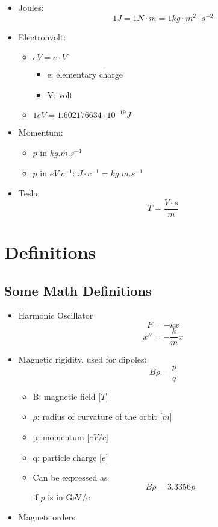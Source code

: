 \documentclass[12pt,a4,]{article}
\numberwithin{equation}{subsection}
\providecommand{\tightlist}{%
  \setlength{\itemsep}{0pt}\setlength{\parskip}{0pt}}
\begin{document}
\begin{itemize}
\item
  Joules: \[1 J = 1 N \cdot m = 1 kg \cdot m^2 \cdot s^{-2}\]
\item
  Electronvolt:

  \begin{itemize}
  \tightlist
  \item
    \(eV = e \cdot V\)

    \begin{itemize}
    \tightlist
    \item
      e: elementary charge
    \item
      V: volt
    \end{itemize}
  \item
    \(1 eV = 1.602176634 \cdot 10^{-19} J\)
  \end{itemize}
\item
  Momentum:

  \begin{itemize}
  \tightlist
  \item
    \(p\) in \(kg.m.s^{-1}\)
  \item
    \(p\) in \(eV.c^{-1}\): \(J \cdot c^{-1} = kg.m.s^{-1}\)
  \end{itemize}
\item
  Tesla \[T = \frac{V \cdot s}{m}\]
\end{itemize}

\newpage

\hypertarget{definitions}{%
\section{Definitions}\label{definitions}}

\hypertarget{some-math-definitions}{%
\subsection{Some Math Definitions}\label{some-math-definitions}}

\begin{itemize}
\item
  Harmonic Oscillator \[F = -kx\] \[x'' = -\frac{k}{m}x \]
\item
  Magnetic rigidity, used for dipoles: \[B\rho = \frac{p}{q}\]

  \begin{itemize}
  \item
    B: magnetic field {[}\(T\){]}
  \item
    \(\rho\): radius of curvature of the orbit {[}\(m\){]}
  \item
    p: momentum {[}\(eV/c\){]}
  \item
    q: particle charge {[}\(e\){]}
  \item
    Can be expressed as \[B \rho = 3.3356 p\] if \(p\) is in GeV/c
  \end{itemize}
\item
  Magnets orders
\end{itemize}
\end{document}
